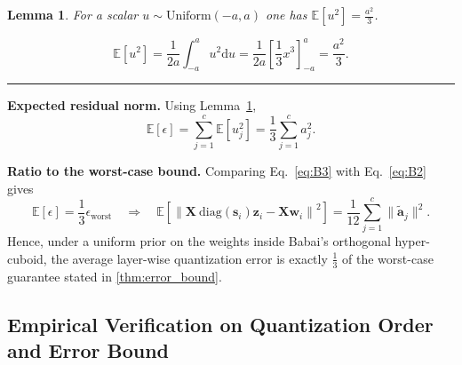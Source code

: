 \documentclass{article} %
\newcommand{\BlackBox}{\rule{1.5ex}{1.5ex}}  %
\renewenvironment{proof}{\par\noindent{\bf Proof\ }}{\hfill\BlackBox\par}
\newenvironment{proof}{\par\noindent{\bf Proof\ }}{\hfill\BlackBox\par}
\newtheorem{lemma}[theorem]{Lemma}
\begin{document}
\begin{lemma}
\label{thm:uniform_square}
For a scalar $u \sim \mathrm{Uniform} \left(-a, a \right)$ one has
$\mathbb{E}[u^2]=\frac{a^2}{3}$.
\end{lemma}
\begin{proof}
\begin{equation}
\mathbb{E}[u^2]
=\frac{1}{2a} \int_{-a}^{a} u^{2} \mathrm{d} u
=\frac{1}{2a} \left[ \frac{1}{3} x^{3} \right]_{-a}^{a}
=\frac{a^2}{3} .
\end{equation}
\end{proof}

\textbf{Expected residual norm.}
Using Lemma~\ref{thm:uniform_square},
\begin{equation}
\mathbb{E}[\epsilon]
=\sum_{j=1}^{c} \mathbb{E} \left[ u_{j}^2 \right]
=\frac{1}{3} \sum_{j=1}^{c} a_{j}^2 .
\label{eq:B3}
\end{equation}

\textbf{Ratio to the worst-case bound.}
Comparing Eq.~\ref{eq:B3} with Eq.~\ref{eq:B2} gives
\begin{equation}
\boxed{
\mathbb{E}[\epsilon] = \frac{1}{3} \epsilon_{\mathrm{worst}}
}
\quad\Longrightarrow\quad
\mathbb{E} \left[ \left\| \bm{X} \mathrm{\ diag} \left( \bm{s}_{i} \right) \bm{z}_{i} - \bm{X} \bm{w}_{i} \right\|^2 \right]
= \frac{1}{12} \sum_{j=1}^{c} \| \tilde{\bm{a}}_{j} \|^2 .
\end{equation}
Hence, under a uniform prior on the weights inside Babai's orthogonal hyper-cuboid, the average layer-wise quantization error is exactly $\frac{1}{3}$ of the worst-case guarantee stated in \cref{thm:error_bound}.

\subsection{Empirical Verification on Quantization Order and Error Bound}
\label{sec:app_quant_order_comparison}
\end{document}
